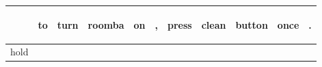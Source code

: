 \documentclass[landscape]{article}
\newcommand{\ssp}{\hspace{2pt}}
\begin{document}
\noindent\begin{tabular}{|l|p{10pt}|p{10pt}|p{10pt}|p{10pt}|p{10pt}|p{10pt}|p{10pt}|p{10pt}|p{10pt}|p{10pt}|}
\hline
&\begin{sideways}\cellcolor{ref0}to\hspace{12pt}\end{sideways}&\begin{sideways}\cellcolor{ref1}turn\hspace{12pt}\end{sideways}&\begin{sideways}\cellcolor{ref2}roomba\hspace{12pt}\end{sideways}&\begin{sideways}\cellcolor{ref3}on\hspace{12pt}\end{sideways}&\begin{sideways}\cellcolor{ref4},\hspace{12pt}\end{sideways}&\begin{sideways}\cellcolor{ref5}press\hspace{12pt}\end{sideways}&\begin{sideways}\cellcolor{ref6}clean\hspace{12pt}\end{sideways}&\begin{sideways}\cellcolor{ref7}button\hspace{12pt}\end{sideways}&\begin{sideways}\cellcolor{ref8}once\hspace{12pt}\end{sideways}&\begin{sideways}\cellcolor{ref9}.\hspace{12pt}\end{sideways}\\
\hline
\ssp hold \ssp&\hspace{2pt}&\hspace{2pt}&\hspace{2pt}&\hspace{2pt}&\hspace{2pt}&\hspace{2pt}&\hspace{2pt}&\hspace{2pt}&\hspace{2pt}&\hspace{2pt}\\

\end{tabular}
\end{document}
